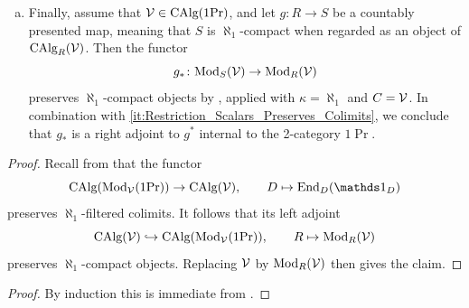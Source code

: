 \documentclass[11pt]{book}
\begin{document}
\begin{remark}
\begin{enumerate}[(a)]
\[\begin{tikzcd}
					\Mod_T(\Vv) \rar & \Mod_U(\Vv).
				\end{tikzcd}
			\]
			The horizontal functors have right adjoints, and we need to show that both composites $\Mod_S(\Vv) \to \Mod_T(\Vv)$ agree, along the canonical map. Computing both sides, we get $T \otimes_R M$ versus $(T \otimes_R S) \otimes_S M$, and these agree. (Details omitted.)
			\item \label{it:Restriction_Scalars_Internal_Right_Adjoint} Finally, assume that $\mathcal{V} \in {\textup{CAlg}}(1\textup{Pr})$, and let $g\colon R \to S$ be a countably presented map, meaning that $S$ is $\aleph_1$-compact when regarded as an object of ${\textup{CAlg}}_R(\mathcal{V})$. Then the functor
			\[
				g_*\colon {\textup{Mod}}_S(\mathcal{V}) \to {\textup{Mod}}_R(\mathcal{V})
			\]
			preserves $\aleph_1$-compact objects by , applied with $\kappa = \aleph_1$ and $C = \mathcal{V}$. In combination with \eqref{it:Restriction_Scalars_Preserves_Colimits}, we conclude that $g_*$ is a right adjoint to $g^*$ internal to the 2-category $1\Pr$.
		\end{enumerate}
	\end{remark}

	\begin{proof}
		Recall from  that the functor
		\[
			\CAlg(\Mod_{\Vv}(1\Pr)) \to \CAlg(\Vv), \qquad D \mapsto \End_{D}(\unit_D)
		\]
		preserves $\aleph_1$-filtered colimits. It follows that its left adjoint
		\[
			{\textup{CAlg}}(\mathcal{V}) \hookrightarrow {\textup{CAlg}}({\textup{Mod}}_{\mathcal{V}}(1\textup{Pr})), \qquad R \mapsto {\textup{Mod}}_R(\mathcal{V})
		\]
		preserves $\aleph_1$-compact objects. Replacing $\mathcal{V}$ by ${\textup{Mod}}_R(\mathcal{V})$ then gives the claim.
	\end{proof}

	\begin{proof}
		By induction this is immediate from .
	\end{proof}
\end{document}
